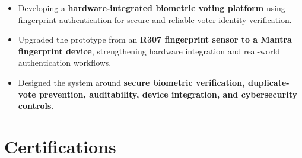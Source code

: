 \documentclass[a4paper,11pt]{article}
\newcommand{\resumeItem}[1]{
    \item \small{#1 \vspace{-2pt}}
}
\begin{document}
\begin{itemize}[leftmargin=*]

\resumeItem{Developing a \textbf{hardware-integrated biometric voting platform} using fingerprint authentication for secure and reliable voter identity verification.}

\resumeItem{Upgraded the prototype from an \textbf{R307 fingerprint sensor to a Mantra fingerprint device}, strengthening hardware integration and real-world authentication workflows.}

\resumeItem{Designed the system around \textbf{secure biometric verification, duplicate-vote prevention, auditability, device integration, and cybersecurity controls}.}

\end{itemize}

\vspace{-4pt}











\section{Certifications}
\end{document}
